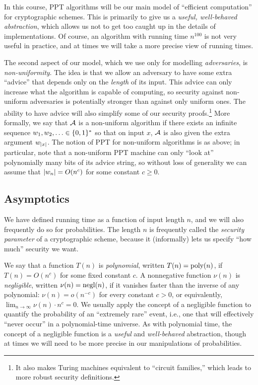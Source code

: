 \documentclass[11pt]{article}
\begin{document}
In this course, PPT algorithms will be our main model of ``efficient
computation'' for cryptographic schemes.  This is primarily to give us
a \emph{useful, well-behaved abstraction}, which allows us not to get
too caught up in the details of implementations.  Of course, an
algorithm with running time $n^{100}$ is not very useful in practice,
and at times we will take a more precise view of running times.

The second aspect of our model, which we use only for modelling
\emph{adversaries}, is \emph{non-uniformity}.  The idea is that we
allow an adversary to have some extra ``advice'' that depends only on
the \emph{length} of its input.  This advice can only increase what
the algorithm is capable of computing, so security against non-uniform
adversaries is potentially stronger than against only uniform ones.
The ability to have advice will also simplify some of our security
proofs.\footnote{It also makes Turing machines equivalent to ``circuit
  families,'' which leads to more robust security definitions.}  More
formally, we say that $\mathcal{A}$ is a non-uniform algorithm if there
exists an infinite sequence $w_{1}, w_{2}, \ldots \in \{0,1\}^{*}$ so
that on input $x$, $\mathcal{A}$ is also given the extra argument
$w_{\lvert x\rvert}$.  The notion of PPT for non-uniform algorithms is as
above; in particular, note that a non-uniform PPT machine can only
``look at'' polynomially many bits of its advice string, so without
loss of generality we can assume that $\lvert w_{n}\rvert = O(n^{c})$ for
some constant $c \geq 0$.

\subsection{Asymptotics}
\label{sec:asymptotics}

We have defined running time as a function of input length $n$, and we
will also frequently do so for probabilities.  The length $n$ is
frequently called the \emph{security parameter} of a cryptographic
scheme, because it (informally) lets us specify ``how much'' security
we want.

We say that a function $T(n)$ is \emph{polynomial}, written $T(n) =
\operatorname{poly}(n)$, if $T(n) = O(n^{c})$ for some fixed constant $c$.  A
nonnegative function $\nu(n)$ is \emph{negligible}, written $\nu(n) =
\operatorname{negl}(n)$, if it vanishes faster than the inverse of any polynomial:
$\nu(n) = o(n^{-c})$ for every constant $c > 0$, or equivalently,
$\lim_{n \to \infty} \nu(n) \cdot n^{c} = 0$.  We usually apply
the concept of a negligible function to quantify the probability of an
``extremely rare'' event, i.e., one that will effectively ``never
occur'' in a polynomial-time universe.  As with polynomial time, the
concept of a negligible function is a \emph{useful} and
\emph{well-behaved} abstraction, though at times we will need to be
more precise in our manipulations of probabilities.
\end{document}
